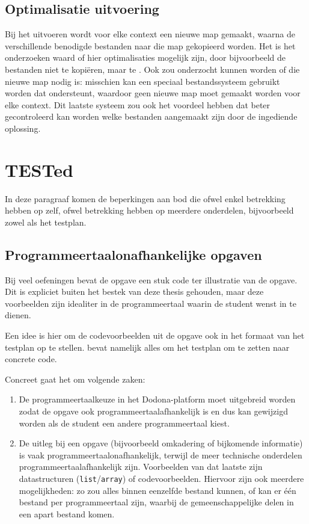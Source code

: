 \subsection{Optimalisatie uitvoering}\label{subsec:optimalisatie-uitvoering}

Bij het uitvoeren wordt voor elke context een nieuwe map gemaakt, waarna de verschillende benodigde bestanden naar die map gekopieerd worden.
Het is het onderzoeken waard of hier optimalisaties mogelijk zijn, door bijvoorbeeld de bestanden niet te kopiëren, maar te .
Ook zou onderzocht kunnen worden of die nieuwe map nodig is: misschien kan een speciaal bestandssysteem gebruikt worden dat  ondersteunt, waardoor geen nieuwe map moet gemaakt worden voor elke context.
Dit laatste systeem zou ook het voordeel hebben dat beter gecontroleerd kan worden welke bestanden aangemaakt zijn door de ingediende oplossing.

\section{TESTed}\label{sec:beperkingen-tested}

In deze paragraaf komen de beperkingen aan bod die ofwel enkel betrekking hebben op \tested{} zelf, ofwel betrekking hebben op meerdere onderdelen, bijvoorbeeld zowel \tested{} als het testplan.

\subsection{Programmeertaalonafhankelijke opgaven}\label{subsec:programmeertaalonafhankelijke-opgaven}

Bij veel oefeningen bevat de opgave een stuk code ter illustratie van de opgave.
Dit is expliciet buiten het bestek van deze thesis gehouden, maar deze voorbeelden zijn idealiter in de programmeertaal waarin de student wenst in te dienen.

Een idee is hier om de codevoorbeelden uit de opgave ook in het formaat van het testplan op te stellen.
\tested{} bevat namelijk alles om het testplan om te zetten naar concrete code.

Concreet gaat het om volgende zaken:
\begin{enumerate}
    \item De programmeertaalkeuze in het Dodona-platform moet uitgebreid worden zodat de opgave ook programmeertaalafhankelijk is en dus kan gewijzigd worden als de student een andere programmeertaal kiest.
    \item De uitleg bij een opgave (bijvoorbeeld omkadering of bijkomende informatie) is vaak programmeertaalonafhankelijk, terwijl de meer technische onderdelen programmeertaalafhankelijk zijn.
    Voorbeelden van dat laatste zijn datastructuren (\texttt{list}/\texttt{array}) of codevoorbeelden.
    Hiervoor zijn ook meerdere mogelijkheden: zo zou alles binnen eenzelfde bestand kunnen, of kan er één bestand per programmeertaal zijn, waarbij de gemeenschappelijke delen in een apart bestand komen.
\end{enumerate}

